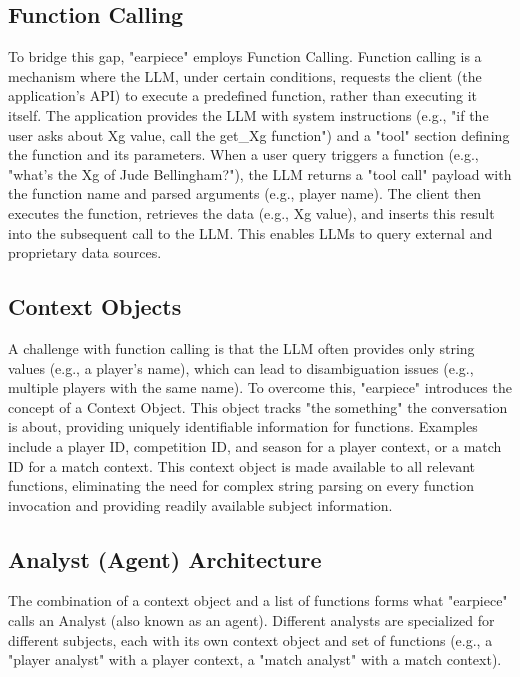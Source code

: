 \documentclass{article}
\begin{document}
\subsection{Function Calling}
To bridge this gap, "earpiece" employs Function Calling. Function calling is a mechanism where the LLM, under certain conditions, requests the client (the application's API) to execute a predefined function, rather than executing it itself. The application provides the LLM with system instructions (e.g., "if the user asks about Xg value, call the get\_Xg function") and a "tool" section defining the function and its parameters. When a user query triggers a function (e.g., "what's the Xg of Jude Bellingham?"), the LLM returns a "tool call" payload with the function name and parsed arguments (e.g., player name). The client then executes the function, retrieves the data (e.g., Xg value), and inserts this result into the subsequent call to the LLM. This enables LLMs to query external and proprietary data sources.

\subsection{Context Objects}
A challenge with function calling is that the LLM often provides only string values (e.g., a player's name), which can lead to disambiguation issues (e.g., multiple players with the same name). To overcome this, "earpiece" introduces the concept of a Context Object. This object tracks "the something" the conversation is about, providing uniquely identifiable information for functions. Examples include a player ID, competition ID, and season for a player context, or a match ID for a match context. This context object is made available to all relevant functions, eliminating the need for complex string parsing on every function invocation and providing readily available subject information.

\subsection{Analyst (Agent) Architecture}
The combination of a context object and a list of functions forms what "earpiece" calls an Analyst (also known as an agent). Different analysts are specialized for different subjects, each with its own context object and set of functions (e.g., a "player analyst" with a player context, a "match analyst" with a match context).
\end{document}
